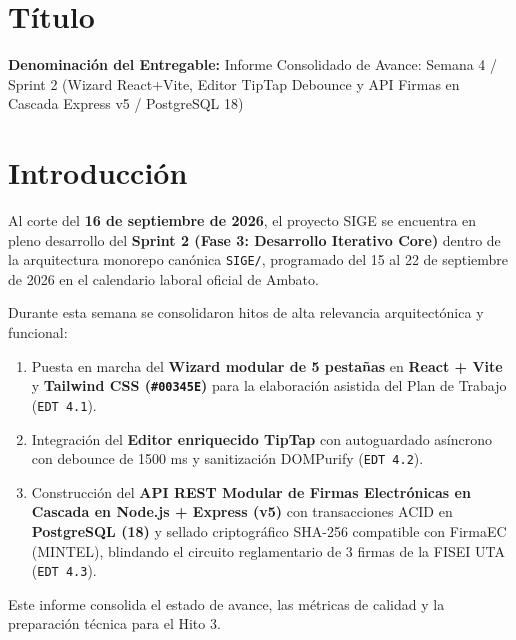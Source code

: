 \documentclass[12pt,a4paper]{article}
\begin{document}
\section{Título}
\textbf{Denominación del Entregable:} Informe Consolidado de Avance: Semana 4 / Sprint 2 (Wizard React+Vite, Editor TipTap Debounce y API Firmas en Cascada Express v5 / PostgreSQL 18)



\section{Introducción}
Al corte del \textbf{16 de septiembre de 2026}, el proyecto SIGE se encuentra en pleno desarrollo del \textbf{Sprint 2 (Fase 3: Desarrollo Iterativo Core)} dentro de la arquitectura monorepo canónica \texttt{SIGE/}, programado del 15 al 22 de septiembre de 2026 en el calendario laboral oficial de Ambato. 

Durante esta semana se consolidaron hitos de alta relevancia arquitectónica y funcional:
\begin{enumerate}[leftmargin=1.5em, itemsep=1.5pt]
    \item Puesta en marcha del \textbf{Wizard modular de 5 pestañas} en \textbf{React + Vite} y \textbf{Tailwind CSS (\texttt{\#00345E})} para la elaboración asistida del Plan de Trabajo (\texttt{EDT 4.1}).
    \item Integración del \textbf{Editor enriquecido TipTap} con autoguardado asíncrono con debounce de 1500 ms y sanitización DOMPurify (\texttt{EDT 4.2}).
    \item Construcción del \textbf{API REST Modular de Firmas Electrónicas en Cascada en Node.js + Express (v5)} con transacciones ACID en \textbf{PostgreSQL (18)} y sellado criptográfico SHA-256 compatible con FirmaEC (MINTEL), blindando el circuito reglamentario de 3 firmas de la FISEI UTA (\texttt{EDT 4.3}).
\end{enumerate}

Este informe consolida el estado de avance, las métricas de calidad y la preparación técnica para el Hito 3.

\end{document}

